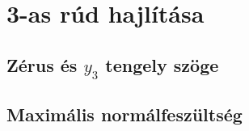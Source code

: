 \section{3-as rúd hajlítása}

\subsection{Zérus és $y_3$ tengely szöge}

\subsection{Maximális normálfeszültség}

